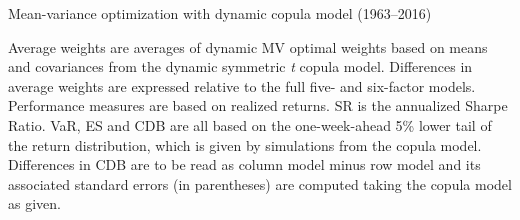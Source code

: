 
\begin{table}
  \centering
  \footnotesize
  \renewcommand{\arraystretch}{1.2}

  \caption{Mean-variance optimization with dynamic copula model (1963--2016)}

  \begin{longcaption}
    Average weights are averages of dynamic MV optimal weights based on means and covariances from the dynamic symmetric \emph{t} copula model. Differences in average weights are expressed relative to the full five- and six-factor models. Performance measures are based on realized returns. SR is the annualized Sharpe Ratio. VaR, ES and CDB are all based on the one-week-ahead 5\% lower tail of the return distribution, which is given by simulations from the copula model. Differences in CDB are to be read as column model minus row model and its associated standard errors (in parentheses) are computed taking the copula model as given.
  \end{longcaption}

  \label{tab:mv_model}


\end{table}
